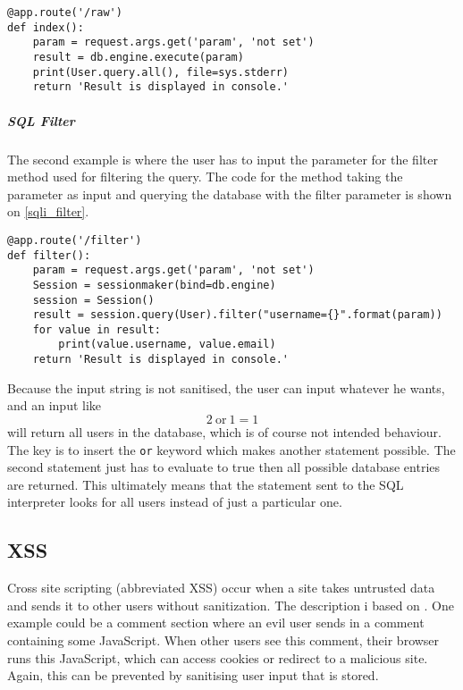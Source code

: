 \begin{lstlisting}[style={python}, deletekeywords={file, FILE}, caption={An SQL statement is taken as input and executed directly on the database}, label={sqli_naive}]
@app.route('/raw')
def index():
    param = request.args.get('param', 'not set')
    result = db.engine.execute(param)
    print(User.query.all(), file=sys.stderr)
    return 'Result is displayed in console.'
\end{lstlisting}

\subparagraph{SQL Filter}
The second example is where the user has to input the parameter for the filter method used for filtering the query.
The code for the method taking the parameter as input and querying the database with the filter parameter is shown on \cref{sqli_filter}.

\begin{lstlisting}[style={python}, caption={A filter string is taken as input and used as a parameter in the filter function.}, label={sqli_filter}]
@app.route('/filter')
def filter():
    param = request.args.get('param', 'not set')
    Session = sessionmaker(bind=db.engine)
    session = Session()
    result = session.query(User).filter("username={}".format(param))
    for value in result:
        print(value.username, value.email)
    return 'Result is displayed in console.'
\end{lstlisting}

Because the input string is not sanitised, the user can input whatever he wants, and an input like
\[2 ~ \text{or} ~ 1 = 1\]
will return all users in the database, which is of course not intended behaviour.
The key is to insert the \texttt{or} keyword which makes another statement possible.
The second statement just has to evaluate to true then all possible database entries are returned.
This ultimately means that the statement sent to the SQL interpreter looks for all users instead of just a particular one.

\subsection{XSS}\label{vulnerabilities:xss}
Cross site scripting (abbreviated XSS) occur when a site takes untrusted data and sends it to other users without sanitization.
The description i based on \citet{crosssitescripting}.
One example could be a comment section where an evil user sends in a comment containing some JavaScript.
When other users see this comment, their browser runs this JavaScript, which can access cookies or redirect to a malicious site.
Again, this can be prevented by sanitising user input that is stored.

